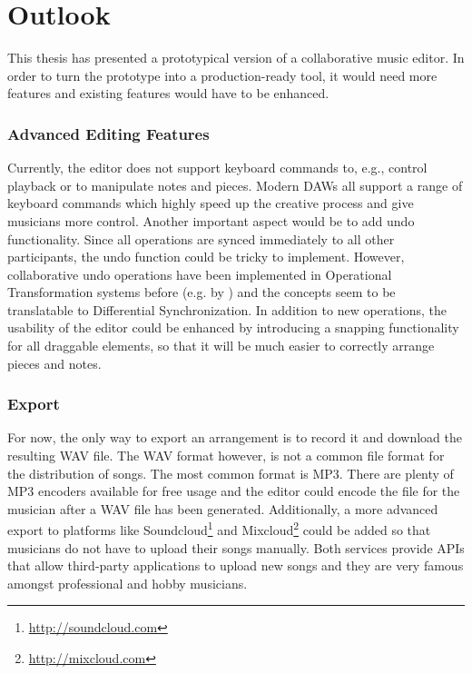 \chapter{Outlook}
\label{ch:outlook}

This thesis has presented a prototypical version of a collaborative music editor. In order to turn the prototype into a production-ready tool, it would need more features and existing features would have to be enhanced.

\subsection{Advanced Editing Features}

Currently, the editor does not support keyboard commands to, e.g., control playback or to manipulate notes and pieces. Modern DAWs all support a range of keyboard commands which highly speed up the creative process and give musicians more control. Another important aspect would be to add undo functionality. Since all operations are synced immediately to all other participants, the undo function could be tricky to implement. However, collaborative undo operations have been implemented in Operational Transformation systems before (e.g. by \cite{ferrie2004concurrentundo}) and the concepts seem to be translatable to Differential Synchronization. In addition to new operations, the usability of the editor could be enhanced by introducing a snapping functionality for all draggable elements, so that it will be much easier to correctly arrange pieces and notes.

\subsection{Export}

For now, the only way to export an arrangement is to record it and download the resulting WAV file. The WAV format however, is not a common file format for the distribution of songs. The most common format is MP3. There are plenty of MP3 encoders available for free usage and the editor could encode the file for the musician after a WAV file has been generated. Additionally, a more advanced export to platforms like Soundcloud\footnote{\url{http://soundcloud.com}} and Mixcloud\footnote{\url{http://mixcloud.com}} could be added so that musicians do not have to upload their songs manually. Both services provide APIs that allow third-party applications to upload new songs and they are very famous amongst professional and hobby musicians.

